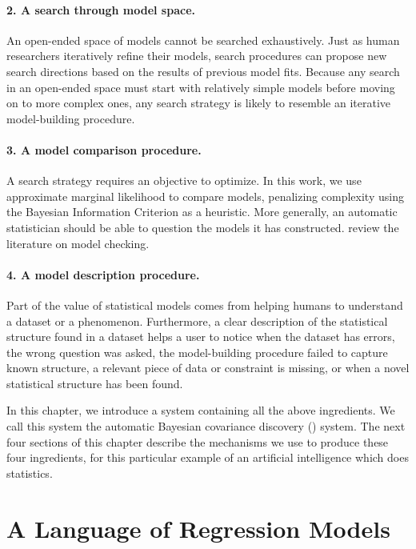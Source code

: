 \paragraph{2. A search through model space.}
An open-ended space of models cannot be searched exhaustively.
Just as human researchers iteratively refine their models, search procedures can propose new search directions based on the results of previous model fits.
Because any search in an open-ended space must start with relatively simple models before moving on to more complex ones, any search strategy is likely to resemble an iterative model-building procedure.

\paragraph{3. A model comparison procedure.}
A search strategy requires an objective to optimize.
In this work, we use approximate marginal likelihood to compare models, penalizing complexity using the Bayesian Information Criterion as a heuristic.
More generally, an automatic statistician should be able to question the models it has constructed.
\citet{gelman2012philosophy} review the literature on model checking.

\paragraph{4. A model description procedure.}
Part of the value of statistical models comes from helping humans to understand a dataset or a phenomenon.
Furthermore, a clear description of the statistical structure found in a dataset helps a user to notice when the dataset has errors, the wrong question was asked, the model-building procedure failed to capture known structure, a relevant piece of data or constraint is missing, or when a novel statistical structure has been found.

In this chapter, we introduce a system containing all the above ingredients.
We call this system the automatic Bayesian covariance discovery (\procedurename{}) system.
The next four sections of this chapter describe the mechanisms we use to produce these four ingredients, for this particular example of an artificial intelligence which does statistics.



\section{A Language of Regression Models}
\label{sec:improvements}

